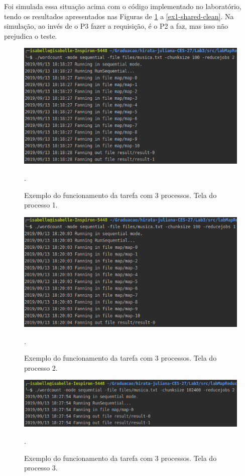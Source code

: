 \documentclass[conference]{IEEEtran}
\begin{document}
	Foi simulada essa situação acima com o código implementado no laboratório, tendo os resultados apresentados nas Figuras de \ref{ex1-proc1-clean} a \ref{ex1-shared-clean}. Na simulação, ao invés de o P3 fazer a requisição, é o P2 a faz, mas isso não prejudica o teste.
	
\begin{figure}[H]
\centering
\centerline{\includegraphics[scale=0.5]{imagens/tarefa_1_4_1/tarefa_1_4_1.png}}
\caption{Exemplo do funcionamento da tarefa com 3 processos. Tela do processo 1.}.
\label{ex1-proc1-clean}
\end{figure}

\begin{figure}[H]
\centering
\centerline{\includegraphics[scale=0.5]{imagens/tarefa_1_4_2/tarefa_1_4_2.png}}
\caption{Exemplo do funcionamento da tarefa com 3 processos. Tela do processo 2.}.
\label{ex1-proc2-clean}
\end{figure}

\begin{figure}[H]
\centering
\centerline{\includegraphics[scale=0.5]{imagens/tarefa_1_4_3/tarefa_1_4_3.png}}
\caption{Exemplo do funcionamento da tarefa com 3 processos. Tela do processo 3.}.
\label{ex1-proc3-clean}
\end{figure}
\end{document}
